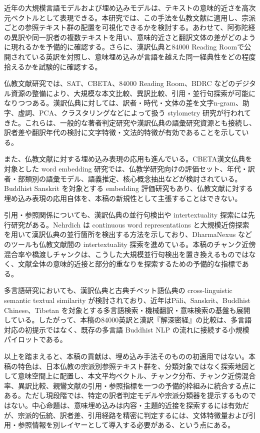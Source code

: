 \documentclass[uplatex,dvipdfmx,11pt,a4paper]{jsarticle}
\begin{document}
近年の大規模言語モデルおよび埋め込みモデルは、テキストの意味的近さを高次元ベクトルとして表現できる。本研究では、この手法を仏教文献に適用し、宗派ごとの参照テキスト群の配置を可視化できるかを検討する。あわせて、阿弥陀経の異訳や同一訳者の複数テキストを用い、意味的近さと翻訳文体の差がどのように現れるかを予備的に確認する。さらに、漢訳仏典と84000 Reading Roomで公開されている英訳を対照し、意味埋め込みが言語を越えた同一経典性をどの程度拾えるかを試験的に確認する。

仏教文献研究では、SAT、CBETA、84000 Reading Room、BDRC などのデジタル資源の整備により、大規模な本文比較、異訳比較、引用・並行句探索が可能になりつつある\cite{sat,cbeta,84000-toh106,bdrc}。漢訳仏典に対しては、訳者・時代・文体の差を文字n-gram、助字、虚詞、PCA、クラスタリングなどによって扱う stylometry 研究が行われてきた\cite{hung2010,bingenheimer2017}。これらは、一般的な著者判定研究\cite{burrows2002,koppel2009}や漢訳仏典の語彙研究資源\cite{karashima2001}とも接続し、訳者差や翻訳年代の検討に文字特徴・文法的特徴が有効であることを示している。

また、仏教文献に対する埋め込み表現の応用も進んでいる。CBETA漢文仏典を対象とした word embedding 研究では、仏教学研究向けの評価セット、年代・訳者・部類別の語彙モデル、語義推定、核心概念抽出などが検討されている\cite{huang2023}。Buddhist Sanskrit を対象とする embedding 評価研究もあり\cite{lugli2022}、仏教文献に対する埋め込み表現の応用自体を、本稿の新規性として主張することはできない。

引用・参照関係についても、漢訳仏典の並行句検出や intertextuality 探索には先行研究がある。Nehrdich は continuous word representations と大規模近傍探索を用いて漢訳仏典の並行箇所を検出する方法を示しており\cite{nehrdich2020}、DharmaNexus などのツールも仏教文献間の intertextuality 探索を進めている\cite{dharmanexus}。本稿のチャンク近傍混合率や橋渡しチャンクは、こうした大規模並行句検出を置き換えるものではなく、文献全体の意味的近接と部分的重なりを探索するための予備的な指標である。

多言語研究においても、漢訳仏典と古典チベット語仏典の cross-linguistic semantic textual similarity が検討されており\cite{felbur2022}、近年はPāli、Sanskrit、Buddhist Chinese、Tibetan を対象とする多言語検索・機械翻訳・意味検索の基盤も展開している\cite{mitra2026}。したがって、本稿の84000英訳と漢訳『解深密経』の比較は、多言語対応の初提示ではなく、既存の多言語 Buddhist NLP の流れに接続する小規模パイロットである。

以上を踏まえると、本稿の貢献は、埋め込み手法そのものの初適用ではない。本稿の特色は、日本仏教の宗派別参照テキスト群を、分類対象ではなく探索地図として意味空間上に配置し、本文平均ベクトル、チャンク分布、チャンク近傍混合率、異訳比較、親鸞文献の引用・参照指標を一つの予備的枠組みに統合する点にある。ただし現段階では、特定の訳者判定モデルや宗派分類器を提示するものではない。中心命題は、意味埋め込みは内容・主題的近接を探索するには有効だが、宗派的伝統、訳者差、引用経路を精密に判定するには、文体特徴量および引用・参照情報を別レイヤーとして導入する必要がある、という点にある。
\end{document}
